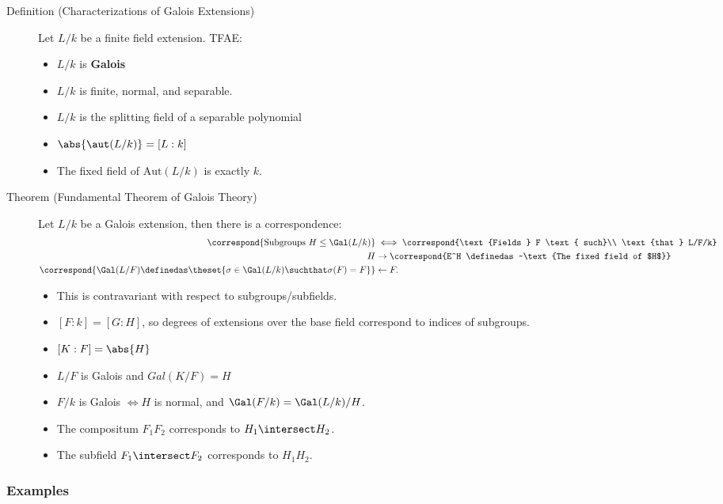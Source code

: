\begin{description}
\item[Definition (Characterizations of Galois Extensions)]
Let \(L/k\) be a finite field extension. TFAE:

\begin{itemize}
\tightlist
\item
  \(L/k\) is \textbf{Galois}
\item
  \(L/k\) is finite, normal, and separable.
\item
  \(L/k\) is the splitting field of a separable polynomial
\item
  \(\abs{\aut(L/k)} = [L: k]\)
\item
  The fixed field of \(\mathrm{Aut}(L/k)\) is exactly \(k\).
\end{itemize}
\item[Theorem (Fundamental Theorem of Galois Theory)]
Let \(L/k\) be a Galois extension, then there is a correspondence:
\begin{align*}
\correspond{\text{Subgroups } H \leq \Gal(L/k)}
&\iff
\correspond{\text{Fields }  F \text{ such}\\ \text{that } L/F/k} \\
H &\rightarrow \correspond{E^H \definedas ~\text{The fixed field of $H$}} \\
\correspond{\Gal(L/F) \definedas \theset{ \sigma \in \Gal(L/k) \suchthat \sigma(F) = F}} &\leftarrow F
.\end{align*}

\begin{itemize}
\item
  This is contravariant with respect to subgroups/subfields.
\item
  \([F: k] = [G: H]\), so degrees of extensions over the base field
  correspond to indices of subgroups.
\item
  \([K : F] = \abs{H}\)
\item
  \(L/F\) is Galois and \(Gal(K/F) = H\)
\item
  \(F/k\) is Galois \(\iff H\) is normal, and
  \(\Gal(F/k) = \Gal(L/k)/H\).
\item
  The compositum \(F_1 F_2\) corresponds to \(H_1 \intersect H_2\).
\item
  The subfield \(F_1 \intersect F_2\) corresponds to \(H_1 H_2\).
\end{itemize}
\end{description}

\hypertarget{examples}{%
\subsubsection{Examples}\label{examples}}

